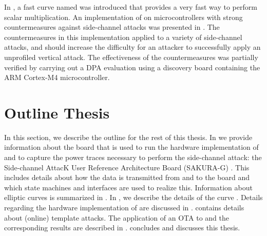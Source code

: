 In \cite{costello2015fourq}, a fast curve named {\fourq} was introduced that provides a very fast way to perform scalar multiplication.
An implementation of {\fourq} on microcontrollers with strong countermeasures against side-channel attacks was presented in \cite{liu2017fourq}. 
The countermeasures in this implementation applied to a variety of side-channel attacks, and should increase the difficulty for an attacker to successfully apply an unprofiled vertical attack.
The effectiveness of the countermeasures was partially verified by carrying out a DPA evaluation using a discovery board containing the ARM Cortex-M4 microcontroller. 


\section{Outline Thesis}
In this section, we describe the outline for the rest of this thesis.
In  we provide information about the board that is used to run the hardware implementation of {\fourq} and to capture the power traces necessary to perform the side-channel attack: the Side-channel AttacK User Reference Architecture
Board (SAKURA-G) \cite{guntur2014side}.
This includes details about how the data is transmitted from and to the board and which state machines and interfaces are used to realize this.
Information about elliptic curves is summarized in .
In , we describe the details of the curve {\fourq}.
Details regarding the hardware implementation of {\fourq} are discussed in .
 contains details about (online) template attacks.
The application of an OTA to {\fourq} and the corresponding results are described in .
 concludes and discusses this thesis.
